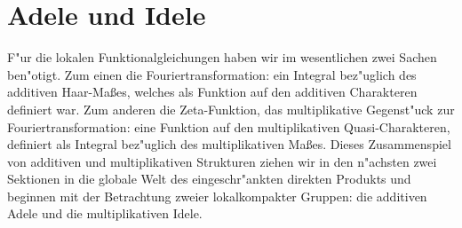 \section{Adele und Idele}
	F"ur die lokalen Funktionalgleichungen haben wir im wesentlichen zwei Sachen ben"otigt.
	Zum einen die Fouriertransformation: ein Integral bez"uglich des additiven Haar-Maßes, welches als Funktion auf den additiven Charakteren definiert war.
	Zum anderen die Zeta-Funktion, das multiplikative Gegenst"uck zur Fouriertransformation: eine Funktion auf den multiplikativen Quasi-Charakteren, definiert als Integral bez"uglich des multiplikativen Maßes.
	Dieses Zusammenspiel von additiven und multiplikativen Strukturen ziehen wir in den n"achsten zwei Sektionen in die globale Welt des eingeschr"ankten direkten Produkts und beginnen mit der Betrachtung zweier lokalkompakter Gruppen: die additiven Adele und die multiplikativen Idele.
